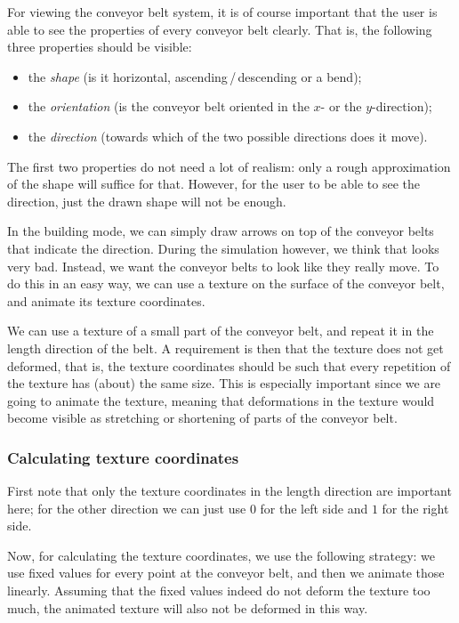 For viewing the conveyor belt system, it is of course important that the user is able to see the properties of every conveyor belt clearly. That is, the following three properties should be visible:
\begin{itemize}
  \item the \textit{shape} (is it horizontal, ascending\,/\,descending or a bend);
  \item the \textit{orientation} (is the conveyor belt oriented in the $x$- or the $y$-direction);
  \item the \textit{direction} (towards which of the two possible directions does it move).
\end{itemize}
The first two properties do not need a lot of realism: only a rough approximation of the shape will suffice for that. However, for the user to be able to see the direction, just the drawn shape will not be enough.

In the building mode, we can simply draw arrows on top of the conveyor belts that indicate the direction. During the simulation however, we think that looks very bad. Instead, we want the conveyor belts to look like they really move. To do this in an easy way, we can use a texture on the surface of the conveyor belt, and animate its texture coordinates.

We can use a texture of a small part of the conveyor belt, and repeat it in the length direction of the belt. A requirement is then that the texture does not get deformed, that is, the texture coordinates should be such that every repetition of the texture has (about) the same size. This is especially important since we are going to animate the texture, meaning that deformations in the texture would become visible as stretching or shortening of parts of the conveyor belt.

\subsubsection{Calculating texture coordinates}
First note that only the texture coordinates in the length direction are important here; for the other direction we can just use $0$ for the left side and $1$ for the right side.

Now, for calculating the texture coordinates, we use the following strategy: we use fixed values for every point at the conveyor belt, and then we animate those linearly. Assuming that the fixed values indeed do not deform the texture too much, the animated texture will also not be deformed in this way.

